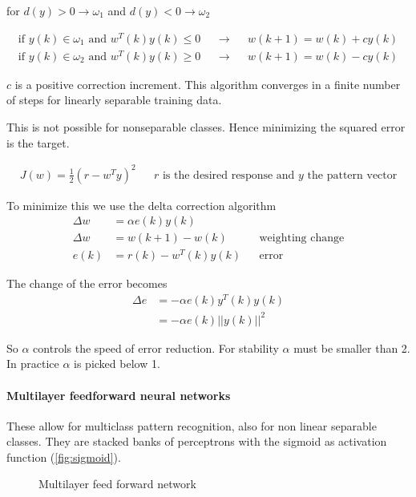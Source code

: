 for $d(y)>0 \rightarrow \omega_1$ and $d(y)<0 \rightarrow \omega_2$

\begin{align*}
\text{if } y(k) \in \omega_1 \text{ and } w^T(k)y(k) \leq 0 && \rightarrow && w(k+1) = w(k) +cy(k) \\
\text{if } y(k) \in \omega_2 \text{ and } w^T(k)y(k) \geq 0 && \rightarrow && w(k+1) = w(k)-cy(k)
\end{align*}


$c$ is a positive correction increment.
This algorithm converges in a finite number of steps for linearly separable training data.

This is not possible for nonseparable classes.
Hence minimizing the squared error is the target.

\begin{align*}
J(w) = \frac{1}{2}(r-w^Ty)^2
&& r \text{ is the desired response and $y$ the pattern vector}
\end{align*}

To minimize this we use the delta correction algorithm
\begin{align*}
\Delta w &= \alpha e(k)y(k) \\
\Delta w &= w(k+1)-w(k) && \text{weighting change} \\
e(k) &= r(k) - w^T(k)y(k) && \text{error}
\end{align*}

The change of the error becomes
\begin{align*}
\Delta e &= -\alpha e(k) y^T(k) y(k) \\
 &= - \alpha e(k) ||y(k)||^2
\end{align*}

So $\alpha$ controls the speed of error reduction.
For stability $\alpha$ must be smaller than 2.
In practice $\alpha$ is picked below 1.

\paragraph{Multilayer feedforward neural networks}
These allow for multiclass pattern recognition, also for non linear separable classes.
They are stacked banks of perceptrons with the sigmoid as activation function (\ref{fig:sigmoid}).

\begin{figure}[htp]
\centering

\caption{Multilayer feed forward network}
\end{figure}

